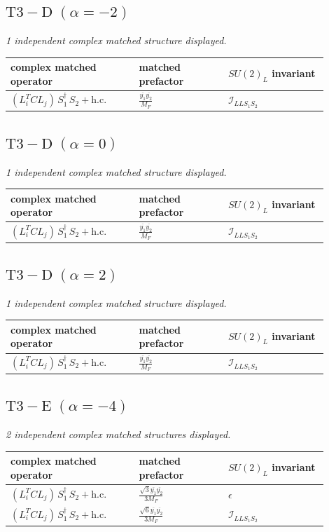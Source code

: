 \documentclass[9pt]{article}
\begin{document}
\subsection*{$ \mathrm{T3-D}\;(\alpha=-2) $}
\textit{1 independent complex matched structure displayed. }
\begin{longtable}{@{}p{0.36\linewidth}p{0.25\linewidth}p{0.29\linewidth}@{}}
\toprule
complex matched operator & matched prefactor & $SU(2)_L$ invariant \\
\midrule
$ (L_i^T C L_j)\,S_1^\dagger\,S_2+\mathrm{h.c.} $ & $ \frac{\overline{y_{1}} \overline{y_{2}}}{M_F} $ & $ \mathcal{I}_{LLS_1S_2} $ \\
\bottomrule
\end{longtable}
\subsection*{$ \mathrm{T3-D}\;(\alpha=0) $}
\textit{1 independent complex matched structure displayed. }
\begin{longtable}{@{}p{0.36\linewidth}p{0.25\linewidth}p{0.29\linewidth}@{}}
\toprule
complex matched operator & matched prefactor & $SU(2)_L$ invariant \\
\midrule
$ (L_i^T C L_j)\,S_1^\dagger\,S_2+\mathrm{h.c.} $ & $ \frac{\overline{y_{1}} \overline{y_{2}}}{M_F} $ & $ \mathcal{I}_{LLS_1S_2} $ \\
\bottomrule
\end{longtable}
\subsection*{$ \mathrm{T3-D}\;(\alpha=2) $}
\textit{1 independent complex matched structure displayed. }
\begin{longtable}{@{}p{0.36\linewidth}p{0.25\linewidth}p{0.29\linewidth}@{}}
\toprule
complex matched operator & matched prefactor & $SU(2)_L$ invariant \\
\midrule
$ (L_i^T C L_j)\,S_1^\dagger\,S_2+\mathrm{h.c.} $ & $ \frac{\overline{y_{1}} \overline{y_{2}}}{M_F} $ & $ \mathcal{I}_{LLS_1S_2} $ \\
\bottomrule
\end{longtable}
\subsection*{$ \mathrm{T3-E}\;(\alpha=-4) $}
\textit{2 independent complex matched structures displayed. }
\begin{longtable}{@{}p{0.36\linewidth}p{0.25\linewidth}p{0.29\linewidth}@{}}
\toprule
complex matched operator & matched prefactor & $SU(2)_L$ invariant \\
\midrule
$ (L_i^T C L_j)\,S_1^\dagger\,S_2+\mathrm{h.c.} $ & $ \frac{\sqrt{3} \overline{y_{1}} \overline{y_{2}}}{3 M_F} $ & $ \epsilon $ \\
$ (L_i^T C L_j)\,S_1^\dagger\,S_2+\mathrm{h.c.} $ & $ \frac{\sqrt{6} \overline{y_{1}} \overline{y_{2}}}{3 M_F} $ & $ \mathcal{I}_{LLS_1S_2} $ \\
\bottomrule
\end{longtable}
\end{document}

